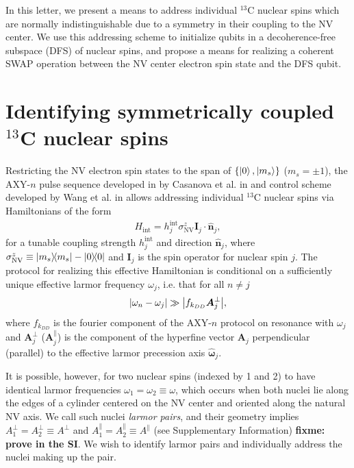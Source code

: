 \documentclass[twocolumn]{revtex4-1}
\renewcommand{\t}{\text} %
\renewcommand{\set}[1]{\left\{#1\right\}} %
\renewcommand{\v}{\bm} %
\newcommand{\uv}[1]{\hat{\v{#1}}} %
\renewcommand{\c}{\cdot} %
\newcommand{\NV}{\t{NV}}
\newcommand{\fixme}[1]{{\bf \color{red} fixme: #1}}
\begin{document}
In this letter, we present a means to address individual $^{13}$C
nuclear spins which are normally indistinguishable due to a symmetry
in their coupling to the NV center. We use this addressing scheme to
initialize qubits in a decoherence-free subspace (DFS) of nuclear
spins, and propose a means for realizing a coherent SWAP operation
between the NV center electron spin state and the DFS qubit.


\section{Identifying symmetrically coupled $^{13}$C nuclear spins}

Restricting the NV electron spin states to the span of
$\set{\ket0,\ket{m_s}}$ ($m_s=\pm1$), the AXY-$n$ pulse sequence
developed in by Casanova et al. in \cite{casanova2015robust} and
control scheme developed by Wang et al. in \cite{wang2016positioning}
allows addressing individual $^{13}$C nuclear spins via Hamiltonians
of the form
\begin{align}
  H_{\t{int}} = h_j^{\t{int}}\sigma_\NV^z\v I_j\c\uv n_j,
  \label{eq:H_int}
\end{align}
for a tunable coupling strength $h_j^{\t{int}}$ and direction
$\uv n_j$, where $\sigma_\NV^z\equiv\op{m_s}-\op{0}$ and $\v I_j$ is
the spin operator for nuclear spin $j$. The protocol for realizing
this effective Hamiltonian is conditional on a sufficiently unique
effective larmor frequency $\omega_j$, i.e. that for all $n\ne j$
\begin{align}
  \abs{\omega_n-\omega_j} \gg \abs{f_{k_{DD}}\v A_j^\perp},
\end{align}
where $f_{k_{DD}}$ is the fourier component of the AXY-$n$ protocol on
resonance with $\omega_j$ and $\v A_j^\perp$ ($\v A_j^\parallel$) is
the component of the hyperfine vector $\v A_j$ perpendicular
(parallel) to the effective larmor precession axis $\uv\omega_j$.

It is possible, however, for two nuclear spins (indexed by 1 and 2) to
have identical larmor frequencies $\omega_1=\omega_2\equiv\omega$,
which occurs when both nuclei lie along the edges of a cylinder
centered on the NV center and oriented along the natural NV axis. We
call such nuclei {\it larmor pairs}, and their geometry implies
$A_1^\perp=A_2^\perp\equiv A^\perp$ and
$A_1^\parallel=A_2^\parallel\equiv A^\parallel$ (see Supplementary
Information) \fixme{prove in the SI}. We wish to identify larmor
pairs and individually address the nuclei making up the pair.
\end{document}
